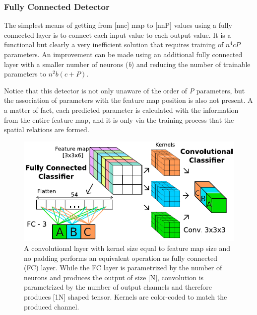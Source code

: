 \subsubsection{Fully Connected Detector}
The simplest means of getting from [n\x n\x c] map to [n\x n\x P] values using a fully connected layer is to connect each input value to each output value. It is a functional but clearly a very inefficient solution that requires training of $n^4cP$ parameters. An improvement can be made using an additional fully connected layer with a smaller number of neurons (\textit{b}) and reducing the number of trainable parameters to $n^2b(c+P)$.

Notice that this detector is not only unaware of the order of \textit{P} parameters, but the association of parameters with the feature map position is also not present. A a matter of fact, each predicted parameter is calculated with the information from the entire feature map, and it is only via the training process that the spatial relations are formed.

\begin{figure}
    \centering
    \includegraphics[width=\textwidth]{img/fc_vs_conv}
    \caption[Comparing fully connected and convolutional classifier]{A convolutional layer with kernel size equal to feature map size and no padding performs an equivalent operation as fully connected (FC) layer. While the FC layer is parametrized by the number of neurons and produces the output of size [N], convolution is parametrized by the number of output channels and therefore produces [1\x N] shaped tensor. Kernels are color-coded to match the produced channel.}
    \label{fig:fc_vs_conv}
\end{figure}

